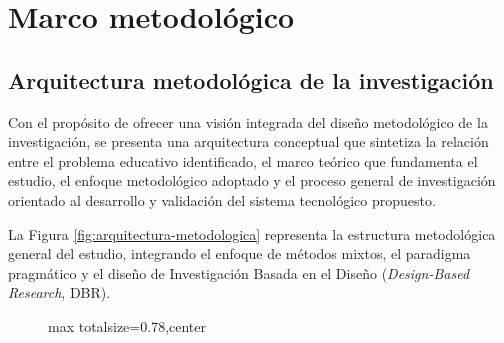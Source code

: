 \chapter{Marco metodológico}

\begin{refsection}

\section{Arquitectura metodológica de la investigación}

Con el propósito de ofrecer una visión integrada del diseño metodológico de la investigación, se presenta una arquitectura conceptual que sintetiza la relación entre el problema educativo identificado, el marco teórico que fundamenta el estudio, el enfoque metodológico adoptado y el proceso general de investigación orientado al desarrollo y validación del sistema tecnológico propuesto.

La Figura \ref{fig:arquitectura-metodologica} representa la estructura metodológica general del estudio, integrando el enfoque de métodos mixtos, el paradigma pragmático y el diseño de Investigación Basada en el Diseño (\textit{Design-Based Research}, DBR).

\begin{figure}[htbp]
\centering
\begin{adjustbox}{max totalsize={\textwidth}{0.78\textheight},center}
\end{adjustbox}
\end{figure}
\end{refsection}
